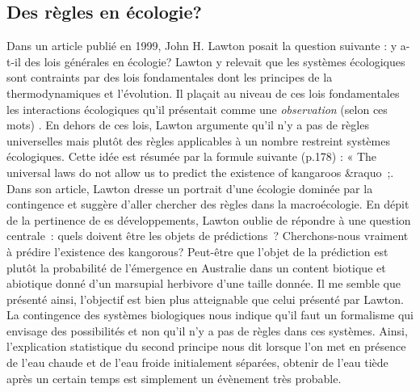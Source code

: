 \subsection*{Des règles en
écologie?}\label{des-ruxe8gles-en-uxe9cologie}

Dans un article publié en 1999, John H. Lawton posait la question
suivante : y a-t-il des lois générales en écologie? Lawton y relevait
que les systèmes écologiques sont contraints par des lois fondamentales
dont les principes de la thermodynamiques et l'évolution. Il plaçait au
niveau de ces lois fondamentales les interactions écologiques qu'il
présentait comme une \emph{observation} (selon ces mots)
\citep{Lawton1999}. En dehors de ces lois, Lawton argumente qu'il n'y a
pas de règles universelles mais plutôt des règles applicables à un
nombre restreint systèmes écologiques. Cette idée est résumée par la
formule suivante (p.178) : « The universal laws do not allow us to
predict the existence of kangaroos \&raquo~;. Dans son article, Lawton
dresse un portrait d'une écologie dominée par la contingence et suggère
d'aller chercher des règles dans la macroécologie. En dépit de la
pertinence de es développements, Lawton oublie de répondre à une
question centrale~: quels doivent être les objets de prédictions~?
Cherchons-nous vraiment à prédire l'existence des kangorous? Peut-être
que l'objet de la prédiction est plutôt la probabilité de l'émergence en
Australie dans un content biotique et abiotique donné d'un marsupial
herbivore d'une taille donnée. Il me semble que présenté ainsi,
l'objectif est bien plus atteignable que celui présenté par Lawton. La
contingence des systèmes biologiques nous indique qu'il faut un
formalisme qui envisage des possibilités et non qu'il n'y a pas de
règles dans ces systèmes. Ainsi, l'explication statistique du second
principe nous dit lorsque l'on met en présence de l'eau chaude et de
l'eau froide initialement séparées, obtenir de l'eau tiède après un
certain temps est simplement un évènement très probable.

